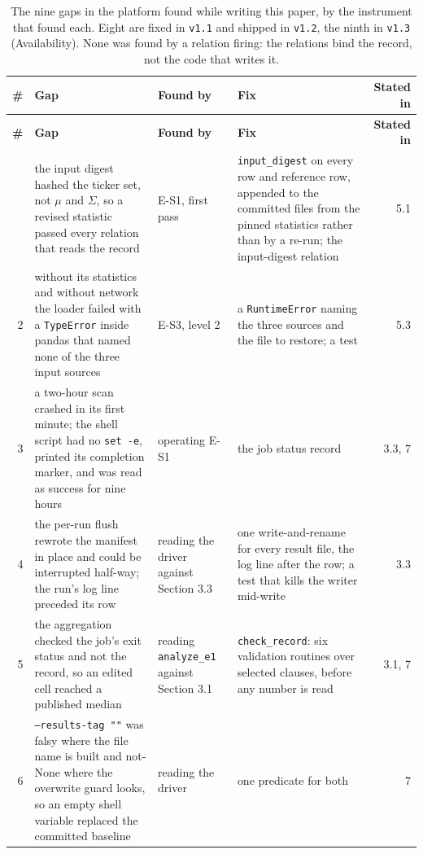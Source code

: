 \documentclass[acmsmall,screen,review]{acmart}
\begin{document}
\begingroup
\small
\setlength\LTleft{\fill}
\setlength\LTright{\fill}
\begin{xltabular}{\textwidth}{r>{\hsize}Y>{\hsize}Y>{\hsize}Yr}
\caption{The nine gaps in the platform found while writing this paper, by the instrument that found each. Eight are fixed in \texttt{v1.1} and shipped in \texttt{v1.2}, the ninth in \texttt{v1.3} (Availability). None was found by a relation firing: the relations bind the record, not the code that writes it.}\label{tab:14} \\
\toprule
\textbf{\#} & \textbf{Gap} & \textbf{Found by} & \textbf{Fix} & \textbf{Stated in} \\
\midrule
\endfirsthead
\toprule
\textbf{\#} & \textbf{Gap} & \textbf{Found by} & \textbf{Fix} & \textbf{Stated in} \\
\midrule
\endhead
\endfoot
\bottomrule
{} & the input digest hashed the ticker set, not $\mu$ and $\Sigma$, so a revised statistic passed every relation that reads the record & E-S1, first pass & \texttt{input\_digest} on every row and reference row, appended to the committed files from the pinned statistics rather than by a re-run; the input-digest relation & 5.1 \\
2 & without its statistics and without network the loader failed with a \texttt{TypeError} inside pandas that named none of the three input sources & E-S3, level 2 & a \texttt{RuntimeError} naming the three sources and the file to restore; a test & 5.3 \\
3 & a two-hour scan crashed in its first minute; the shell script had no \texttt{set -e}, printed its completion marker, and was read as success for nine hours & operating E-S1 & the job status record & 3.3, 7 \\
4 & the per-run flush rewrote the manifest in place and could be interrupted half-way; the run's log line preceded its row & reading the driver against Section 3.3 & one write-and-rename for every result file, the log line after the row; a test that kills the writer mid-write & 3.3 \\
5 & the aggregation checked the job's exit status and not the record, so an edited cell reached a published median & reading \texttt{analyze\_e1} against Section 3.1 & \texttt{check\_record}: six validation routines over selected clauses, before any number is read & 3.1, 7 \\
6 & \texttt{--results-tag ""} was falsy where the file name is built and not-None where the overwrite guard looks, so an empty shell variable replaced the committed baseline & reading the driver & one predicate for both & 7 \\

\end{xltabular}
\end{document}
